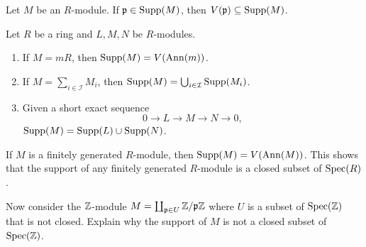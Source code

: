 \documentclass{ximera}
\begin{document}
\begin{exercise}
  Let $M$ be an $R$-module. If $\mathfrak{p}\in\operatorname{Supp}(M)$, then
  $V(\mathfrak{p})\subseteq\operatorname{Supp}(M)$.
\end{exercise}



\begin{proposition}%
  Let $R$ be a ring and $L,M,N$ be $R$-modules.
  \begin{enumerate}
  \item If $M = mR$, then $\operatorname{Supp}(M) = V(\operatorname{Ann}(m))$.
  \item If $M = \sum_{i\in \mathcal I} M_i$, then $\operatorname{Supp}(M) = \bigcup_{i\in \mathcal I} \operatorname{Supp}(M_i)$.
  \item Given a short exact sequence
    \[
    0 \to L \to M \to N \to 0,
    \]
    $\operatorname{Supp}(M) = \operatorname{Supp}(L) \cup \operatorname{Supp}(N)$.
  \end{enumerate}
\end{proposition}

\begin{exercise}
  If $M$ is a finitely generated $R$-module, then $\operatorname{Supp}(M) = V(\operatorname{Ann}(M))$.  This
  shows that the support of any finitely generated $R$-module is a
  closed subset of $\operatorname{Spec}(R)$.

  Now consider the $\mathbb Z$-module $M = \coprod_{\mathfrak{p}\in U} \mathbb Z/\mathfrak{p}\mathbb Z$ where $U$
  is a subset of $\operatorname{Spec}(\mathbb Z)$ that is not closed. Explain why the
  support of $M$ is not a closed subset of $\operatorname{Spec}(\mathbb Z)$.
\end{exercise}





\end{document}
